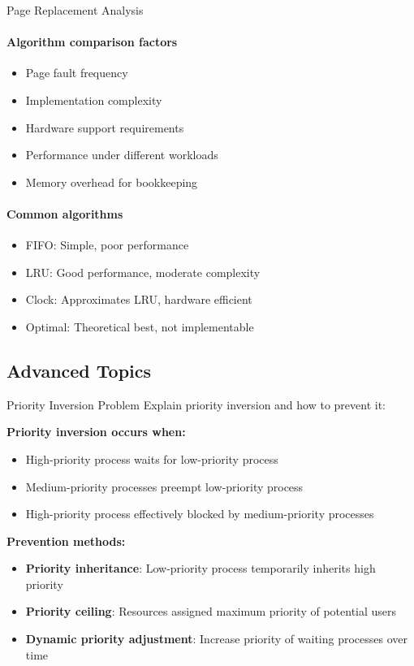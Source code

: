 \begin{KR}{Page Replacement Analysis}
    \paragraph{Algorithm comparison factors}
    \begin{itemize}
        \item Page fault frequency
        \item Implementation complexity
        \item Hardware support requirements
        \item Performance under different workloads
        \item Memory overhead for bookkeeping
    \end{itemize}
    
    \paragraph{Common algorithms}
    \begin{itemize}
        \item FIFO: Simple, poor performance
        \item LRU: Good performance, moderate complexity
        \item Clock: Approximates LRU, hardware efficient
        \item Optimal: Theoretical best, not implementable
    \end{itemize}
\end{KR}

\raggedcolumns
\columnbreak

\subsection{Advanced Topics}

\begin{example2}{Priority Inversion Problem}
    Explain priority inversion and how to prevent it:
    
    \tcblower
    
    \textbf{Priority inversion occurs when:}
    \begin{itemize}
        \item High-priority process waits for low-priority process
        \item Medium-priority processes preempt low-priority process
        \item High-priority process effectively blocked by medium-priority processes
    \end{itemize}
    
    \textbf{Prevention methods:}
    \begin{itemize}
        \item \textbf{Priority inheritance}: Low-priority process temporarily inherits high priority
        \item \textbf{Priority ceiling}: Resources assigned maximum priority of potential users
        \item \textbf{Dynamic priority adjustment}: Increase priority of waiting processes over time
    \end{itemize}
\end{example2}

